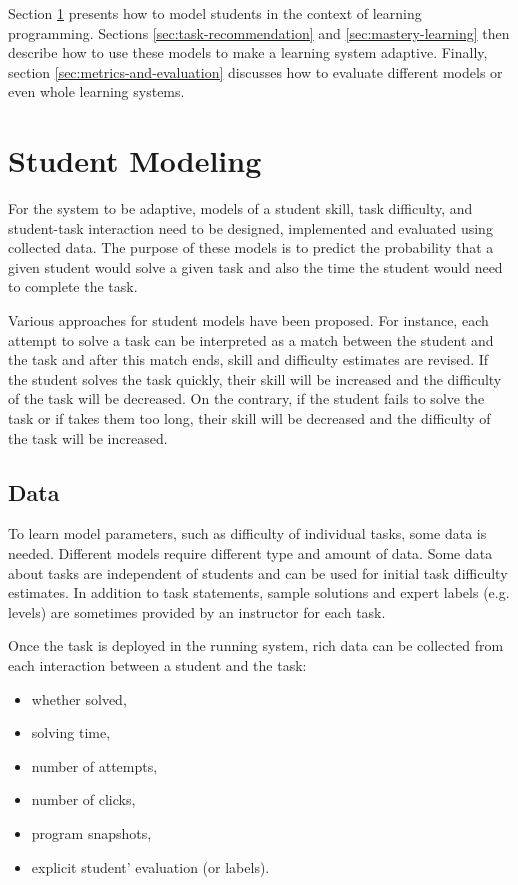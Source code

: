 Section \ref{sec:student-modeling} presents how to model students
  in the context of learning programming.
Sections \ref{sec:task-recommendation} and \ref{sec:mastery-learning}
  then describe how to use these models to make a learning system adaptive.
Finally, section \ref{sec:metrics-and-evaluation} discusses how to evaluate
  different models or even whole learning systems.

\section{Student Modeling}
\label{sec:student-modeling}

For the system to be adaptive, models of
  a student skill, task difficulty, and student-task interaction
  need to be designed, implemented and evaluated using collected data.
The purpose of these models is to predict the probability that a given student
  would solve a given task
  and also the time the student would need to complete the task.

Various approaches for student models have been proposed.
For instance, each attempt to solve a task can be interpreted
  as a match between the student and the task and after this match ends,
  skill and difficulty estimates are revised.
If the student solves the task quickly, their skill will be increased
  and the difficulty of the task will be decreased.
On the contrary, if the student fails to solve the task or if takes them too long,
  their skill will be decreased and the difficulty of the task will be increased.


\subsection{Data}
\label{sec:student-modeling.data}

To learn model parameters, such as difficulty of individual tasks, some data is needed.
Different models require different type and amount of data.
Some data about tasks are independent of students and can be used
  for initial task difficulty estimates.
In addition to task statements, sample solutions and expert labels (e.g. levels)
  are sometimes provided by an instructor for each task.

Once the task is deployed in the running system,
  rich data can be collected from each interaction between a student and the task:
\begin{itemize}
  \item whether solved,
  \item solving time,
  \item number of attempts,
  \item number of clicks,
  \item program snapshots,
  \item explicit student' evaluation (or labels). %
\end{itemize}

